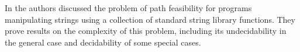 

%


In \cite{BTV09} the authors discussed the problem of path feasibility for programs manipulating strings using a collection of standard string library functions. They prove results on the complexity of this problem, including its undecidability in the general case and decidability of some special cases. 


